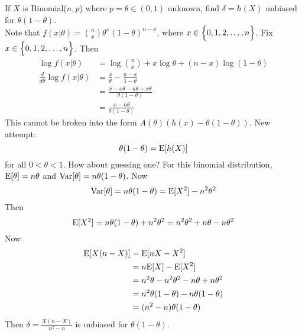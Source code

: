 \documentclass[12pt]{article}
\begin{document}
If $X$ is Binomial($n,p$) where $p=\theta \in (0,1)$ unknown, find $\delta = h(X)$ unbiased for $\theta(1-\theta)$. \\
Note that $f(x|\theta) = \binom{n}{x}\theta^x(1-\theta)^{n-x}$, where $x \in \Big\{ 0,1,2,\dots,n \Big\}$. Fix $x \in \Big\{ 0,1,2,\dots,n \Big\}$. Then $$ \begin{aligned} \log f(x|\theta) &= \log \binom{n}{x} + x\log \theta + (n-x)\log (1-\theta) \\ \frac{d}{d\theta} \log f(x|\theta) &= \frac{x}{\theta} - \frac{n-x}{1-\theta} \\ &= \frac{x-x\theta - n\theta + x\theta}{\theta(1-\theta)} \\ &= \frac{x-n\theta}{\theta(1-\theta)} \end{aligned} $$ This cannot be broken into the form $A(\theta)(h(x) - \theta(1-\theta))$. New attempt: $$ \theta(1-\theta) = \mathrm{E}[ h(X) ]$$ for all $0 < \theta < 1$. How about guessing one? For this binomial distribution, $\mathrm{E}[ \theta ] = n\theta$ and $\mathrm{Var}[ \theta ] = n\theta(1-\theta)$. Now $$ \mathrm{Var}[ \theta ] = n\theta(1-\theta) = \mathrm{E}[ X^2 ] - n^2\theta^2$$ 
Then $$ \mathrm{E}[ X^2 ] = n\theta(1-\theta) + n^2\theta^2 = n^2\theta^2 + n\theta - n\theta^2 $$ 
Now $$ \begin{aligned} \mathrm{E}[ X(n-X) ] &= \mathrm{E}[ nX - X^2 ] \\ &= n\mathrm{E}[ X ] - \mathrm{E}[ X^2 ] \\ &= n^2\theta - n^2\theta^2 - n\theta + n\theta^2 \\ &= n^2\theta(1-\theta) - n\theta(1-\theta) \\ &= (n^2 - n)\theta(1-\theta) \end{aligned} $$ 
Then $\delta = \frac{X(n-X)}{n^2 - n}$ is unbiased for $\theta(1-\theta)$. 
\end{document}
